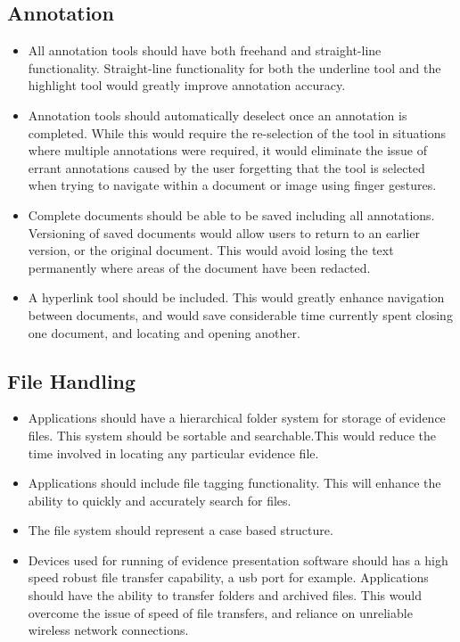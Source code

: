 \subsection{Annotation}
\begin{itemize}
    \item All annotation tools should have both freehand and straight-line functionality. Straight-line functionality for both the underline tool and the highlight tool would greatly improve annotation accuracy.
    \item Annotation tools should automatically deselect once an annotation is completed. While this would require the re-selection of the tool in situations where multiple annotations were required, it would eliminate the issue of errant annotations caused by the user forgetting that the tool is selected when trying to navigate within a document or image using finger gestures.
    \item Complete documents should be able to be saved including all annotations. Versioning of saved documents would allow users to return to an earlier version, or the original document. This would avoid losing the text permanently where areas of the document have been redacted.
    \item A hyperlink tool should be included. This would greatly enhance navigation between documents, and would save considerable time currently spent closing one document, and locating and opening another.
\end{itemize}
\subsection{File Handling}
\begin{itemize}
    \item Applications should have a hierarchical folder system for storage of evidence files. This system should be sortable and searchable.This would reduce the time involved in locating any particular evidence file.
    \item Applications should include file tagging functionality. This will enhance the ability to quickly and accurately search for files.
    \item The file system should represent a case based structure.
    \item Devices used for running of evidence presentation software should has a high speed robust file transfer capability, a usb port for example. Applications should have the ability to transfer folders and archived files. This would overcome the issue of speed of file transfers, and reliance on unreliable wireless network connections.
\end{itemize}
